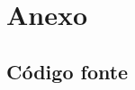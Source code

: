 \documentclass[runningheads,a4paper]{llncs}
\begin{document}
\pagebreak

\section*{Anexo}

\subsection*{Código fonte}

\newenvironment{changemargin}[2]{%
\begin{list}{}{%
\setlength{\topsep}{0pt}%
\setlength{\leftmargin}{#1}%
\setlength{\rightmargin}{#2}%
\setlength{\listparindent}{\parindent}%
\setlength{\itemindent}{\parindent}%
\setlength{\parsep}{\parskip}%
}%
\item[]}{
\end{list}}

\medskip
\end{document}
